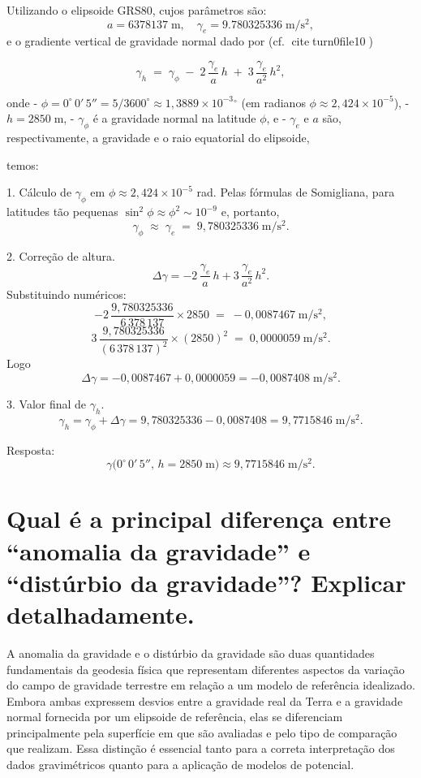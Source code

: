 Utilizando o elipsoide GRS80, cujos parâmetros são:
\[
a = 6378137\;\mathrm{m},\quad
\gamma_e = 9.780325336\;\mathrm{m/s^2},
\]  
e o gradiente vertical de gravidade normal dado por (cf. citeturn0file10)

\[
\gamma_h \;=\;\gamma_\phi\;-\;2\,\frac{\gamma_e}{a}\,h\;+\;3\,\frac{\gamma_e}{a^2}\,h^2,
\]

onde  
- \(\phi=0^\circ\,0'\,5''=5/3600^\circ\approx1{,}3889\times10^{-3}{}^\circ\) (em radianos \(\phi\approx2{,}424\times10^{-5}\)),  
- \(h=2850\;\mathrm{m}\),  
- \(\gamma_\phi\) é a gravidade normal na latitude \(\phi\), e  
- \(\gamma_e\) e \(a\) são, respectivamente, a gravidade e o raio equatorial do elipsoide,

temos:

1. Cálculo de \(\gamma_\phi\) em \(\phi\approx2{,}424\times10^{-5}\) rad.  
   Pelas fórmulas de Somigliana, para latitudes tão pequenas \(\sin^2\phi\approx\phi^2\sim10^{-9}\) e, portanto,  
   \[
   \gamma_\phi\;\approx\;\gamma_e\;=\;9{,}780325336\;\mathrm{m/s^2}.
   \]

2. Correção de altura.  
   \[
   \Delta\gamma
   = -2\,\frac{\gamma_e}{a}\,h
     +3\,\frac{\gamma_e}{a^2}\,h^2.
   \]
   Substituindo numéricos:
   \[
   -2\,\frac{9{,}780325336}{6\,378\,137}\times2850
     \;=\;-0{,}0087467\;\mathrm{m/s^2},
   \]
   \[
    3\,\frac{9{,}780325336}{(6\,378\,137)^2}\times(2850)^2
     \;=\;0{,}0000059\;\mathrm{m/s^2}.
   \]
   Logo
   \[
   \Delta\gamma = -0{,}0087467 + 0{,}0000059 = -0{,}0087408\;\mathrm{m/s^2}.
   \]

3. Valor final de \(\gamma_h\).  
   \[
   \gamma_h = \gamma_\phi + \Delta\gamma
            = 9{,}780325336 - 0{,}0087408
            = 9{,}7715846\;\mathrm{m/s^2}.
   \]

Resposta:  
\[
\boxed{\gamma\bigl(0^\circ\,0'\,5'',\,h=2850\;\mathrm{m}\bigr)\approx9{,}7715846\;\mathrm{m/s^2}.}
\]


\section{Qual é a principal diferença entre “anomalia da gravidade” e “distúrbio da gravidade”? Explicar detalhadamente.}

A anomalia da gravidade e o distúrbio da gravidade são duas quantidades fundamentais da geodesia física que representam diferentes aspectos da variação do campo de gravidade terrestre em relação a um modelo de referência idealizado. Embora ambas expressem desvios entre a gravidade real da Terra e a gravidade normal fornecida por um elipsoide de referência, elas se diferenciam principalmente pela superfície em que são avaliadas e pelo tipo de comparação que realizam. Essa distinção é essencial tanto para a correta interpretação dos dados gravimétricos quanto para a aplicação de modelos de potencial.

